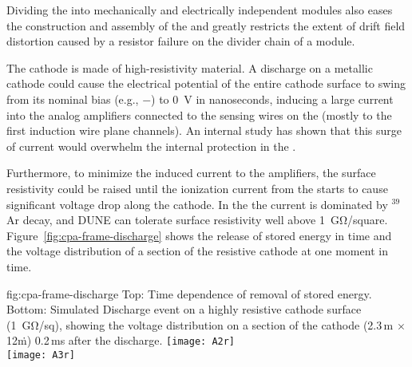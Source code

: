 Dividing the  into mechanically and electrically independent modules also eases the construction and assembly of the  and greatly restricts the extent of drift field distortion caused by a resistor failure on the divider chain of a  module.

The cathode is made of high-resistivity material. A  discharge 
on a metallic cathode could cause the electrical potential of the entire cathode surface to swing from its nominal bias (e.g., $-$\sptargetdriftvoltpos) to \SI{0}{V} in nanoseconds, inducing a large current into the analog  amplifiers connected to the sensing wires on the  (mostly to the first induction wire plane channels). An internal study\cite{bib:docdb1320} has shown that this surge of current would overwhelm the internal  protection in the  .  

Furthermore, to minimize the induced current to the amplifiers, the surface resistivity could be raised until the ionization current from the  starts to cause significant voltage drop along the cathode.  In the  the current is dominated by $^{39}$Ar decay, and DUNE can tolerate surface resistivity well above \SI{1}{\giga\ohm/square}. Figure~\ref{fig:cpa-frame-discharge} shows the release of stored energy in time and the voltage distribution of a section of the resistive cathode at one moment in time. 

\begin{dunefigure}
{fig:cpa-frame-discharge}
{Top: Time dependence of removal of stored energy. Bottom: Simulated  Discharge event on a highly resistive cathode surface (\SI{1}{\giga\ohm/sq}), showing the voltage distribution on a section of the cathode (2.3\,m $\times$ 12\.m) 0.2\,ms after the discharge. }
\centering
\texttt{[image: A2r]} \\ \vspace{30pt}    %
\texttt{[image: A3r]}
\end{dunefigure}

